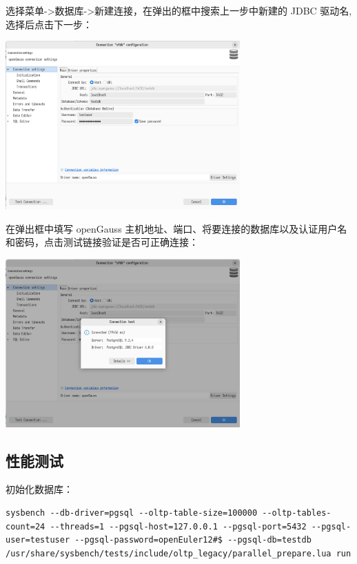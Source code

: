 \documentclass{article}
\begin{document}
选择菜单->数据库->新建连接，在弹出的框中搜索上一步中新建的 JDBC 驱动名,选择后点击下一步：

\begin{center}
\includegraphics[width=9cm]{./image/4.png}
\end{center}

在弹出框中填写 openGauss 主机地址、端口、将要连接的数据库以及认证用户名和密码，点击测试链接验证是否可正确连接：

\begin{center}
\includegraphics[width=9cm]{./image/5.png}
\end{center}


\subsection{性能测试}

初始化数据库：

\begin{verbatim}
sysbench --db-driver=pgsql --oltp-table-size=100000 --oltp-tables-count=24 --threads=1 --pgsql-host=127.0.0.1 --pgsql-port=5432 --pgsql-user=testuser --pgsql-password=openEuler12#$ --pgsql-db=testdb  /usr/share/sysbench/tests/include/oltp_legacy/parallel_prepare.lua run
\end{verbatim}
\end{document}
